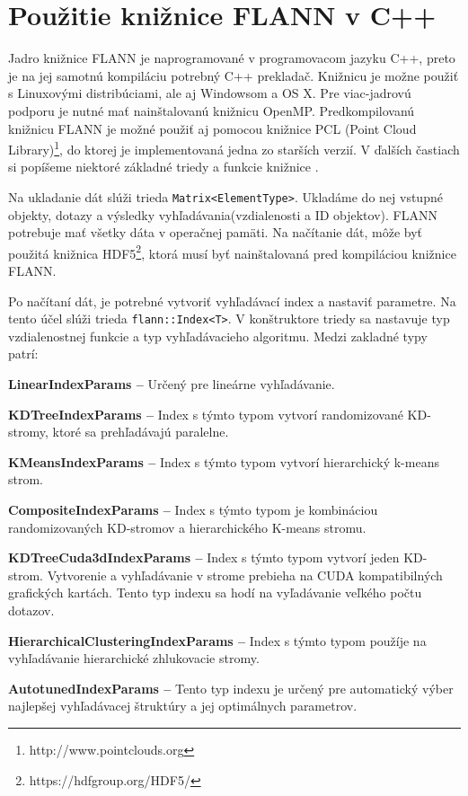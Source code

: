 \documentclass[12pt,a4paper,oneside]{fithesis2}
\begin{document}
	\section{Použitie knižnice FLANN v C++}
	Jadro knižnice FLANN je naprogramované v programovacom jazyku C++, preto je na jej samotnú kompiláciu potrebný C++ prekladač. Knižnicu je možne použiť s Linuxovými distribúciami, ale aj Windowsom a OS X. Pre viac-jadrovú podporu je nutné mať nainštalovanú knižnicu OpenMP. Predkompilovanú knižnicu FLANN je  možné použiť aj pomocou knižnice PCL (Point Cloud Library)\footnote{http://www.pointclouds.org}, do ktorej je implementovaná jedna zo starších verzií. V ďalších častiach si popíšeme niektoré základné triedy a funkcie knižnice \cite{manual}.
	
	Na ukladanie dát slúži trieda \texttt{Matrix<ElementType>}. Ukladáme do nej vstupné objekty, dotazy a výsledky vyhľadávania(vzdialenosti a ID objektov). FLANN potrebuje mať všetky dáta v operačnej pamäti. Na načítanie dát, môže byť použitá knižnica HDF5\footnote{https://hdfgroup.org/HDF5/}, ktorá musí byť nainštalovaná pred kompiláciou knižnice FLANN. 
	
	Po načítaní dát, je potrebné vytvoriť vyhľadávací index a nastaviť parametre. Na tento účel slúži trieda \texttt{flann::Index<T>}. V konštruktore triedy sa nastavuje typ vzdialenostnej funkcie a typ vyhľadávacieho algoritmu. Medzi zakladné typy patrí:
	\begin{description}
	\item \textbf{LinearIndexParams --} Určený pre lineárne vyhľadávanie.
	
	\item \textbf{KDTreeIndexParams --} Index s týmto typom vytvorí randomizované KD-stromy, ktoré sa prehľadávajú paralelne. 

	\item \textbf{KMeansIndexParams --} Index s týmto typom vytvorí hierarchický k-means strom.

	\item \textbf{CompositeIndexParams --} Index s týmto typom je kombináciou randomizovaných KD-stromov a hierarchického K-means stromu. 

	\item \textbf{KDTreeCuda3dIndexParams --} Index s týmto typom vytvorí jeden KD-strom. Vytvorenie a vyhľadávanie v strome prebieha na CUDA kompatibilných grafických kartách. Tento typ indexu sa hodí na vyľadávanie veľkého počtu dotazov.
	
	\item \textbf{HierarchicalClusteringIndexParams --} Index s týmto typom použíje na vyhľadávanie hierarchické zhlukovacie stromy.

	\item \textbf{AutotunedIndexParams --} Tento typ indexu je určený pre automatický výber najlepšej vyhľadávacej štruktúry a jej optimálnych parametrov.
	
	\end{description}
\end{document}

